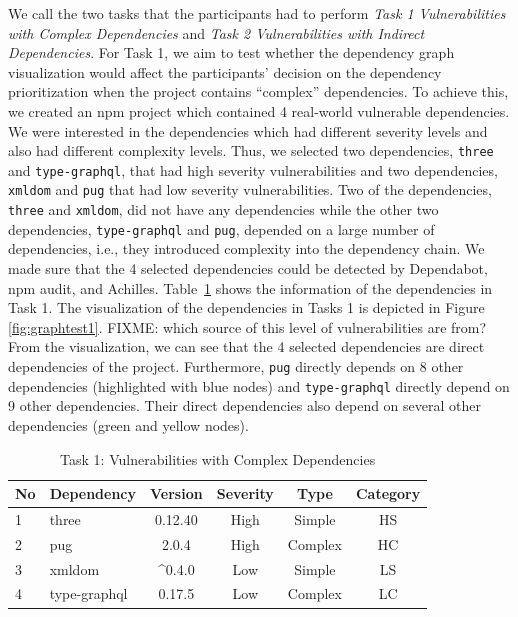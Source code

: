 \documentclass[conference]{IEEEtran}
\newcommand{\FIXME}[1]{{\color{red}\textsf{FIXME: #1}}}
\begin{document}
	We call the two tasks that the participants had to perform \textit{Task 1 Vulnerabilities with Complex Dependencies} and \textit{Task 2 Vulnerabilities with Indirect Dependencies}. For Task 1, we aim to test whether the dependency graph visualization  would affect the participants’ decision on the dependency prioritization when the project contains ``complex'' dependencies. To achieve this, we created an npm project which contained 4 real-world vulnerable dependencies. We were interested in the dependencies which had different severity levels and also had different complexity levels. Thus, we selected two dependencies, \texttt{three} and \texttt{type-graphql}, that had high severity vulnerabilities and two dependencies, \texttt{xmldom} and \texttt{pug} that had low severity vulnerabilities. Two of the dependencies, \texttt{three} and \texttt{xmldom}, did not have any dependencies while the other two dependencies, \texttt{type-graphql} and \texttt{pug}, depended on a large number of dependencies, i.e., they introduced complexity into the dependency chain. 
	We made sure that the 4 selected dependencies could be detected by Dependabot, npm audit, and Achilles. Table~\ref{table:cha-teat1} shows the information of the dependencies in Task 1. The visualization of the dependencies in Tasks 1 is depicted in Figure \ref{fig:graphtest1}. \FIXME{which source of this level of vulnerabilities are from?} From the visualization, we can see %
	that the 4 selected dependencies are direct dependencies of the project. Furthermore, \texttt{pug} directly depends on 8 other dependencies (highlighted with blue nodes) and \texttt{type-graphql} directly depend on 9 other dependencies. Their direct dependencies also depend on several other dependencies (green and yellow nodes).
		
	\begin{table}[tb]
		\centering
		\caption{Task 1: Vulnerabilities with Complex Dependencies}
		\begin{tabular}{llcccc}
			\toprule
			No & Dependency & Version & Severity & Type & Category \\
			\midrule
			1 & three & 0.12.40 & High & Simple & HS \\
			2 & pug & 2.0.4 & High & Complex &  HC \\
			3 & xmldom & \^{}0.4.0 & Low & Simple & LS \\
			4 & type-graphql & 0.17.5 & Low & Complex & LC \\
			\bottomrule
		\end{tabular}
		\label{table:cha-teat1}
	\end{table}
	
\end{document}
